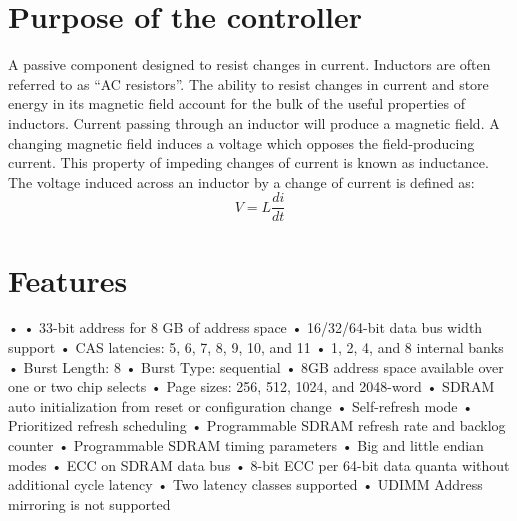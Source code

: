\section{Purpose of the controller}

\hspace{10mm}A passive component designed to resist changes in current. Inductors are often referred to as “AC resistors”. The ability
to resist changes in current and store energy in its magnetic field account for the bulk of the useful properties of inductors. Current passing through an inductor will produce a magnetic field. A changing magnetic field induces a voltage which opposes the field-producing current. This property of impeding changes of current is known as inductance. The voltage induced across an inductor by a change of current is defined as:
$$V = L \frac{di}{dt}$$



\section{Features}


• 
• 33-bit address for 8 GB of address space
• 16/32/64-bit data bus width support
• CAS latencies: 5, 6, 7, 8, 9, 10, and 11
• 1, 2, 4, and 8 internal banks
• Burst Length: 8
• Burst Type: sequential
• 8GB address space available over one or two chip selects
• Page sizes: 256, 512, 1024, and 2048-word
• SDRAM auto initialization from reset or configuration change
• Self-refresh mode
• Prioritized refresh scheduling
• Programmable SDRAM refresh rate and backlog counter
• Programmable SDRAM timing parameters
• Big and little endian modes
• ECC on SDRAM data bus
• 8-bit ECC per 64-bit data quanta without additional cycle latency
• Two latency classes supported
• UDIMM Address mirroring is not supported


